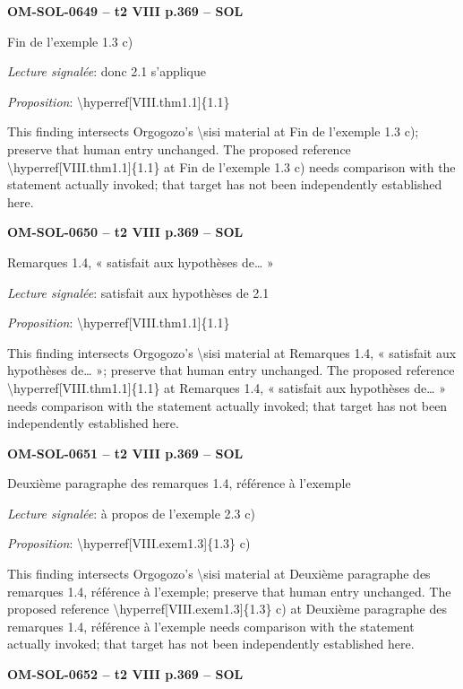 \par\noindent\textbf{OM-SOL-0649 -- t2 VIII p.369 -- SOL}\par
Fin de l'exemple 1.3 c)\par
\emph{Lecture signalée}: donc 2.1 s'applique\par
\emph{Proposition}: \textbackslash{}hyperref[VIII.thm1.1]\{1.1\}\par
This finding intersects Orgogozo's \textbackslash{}sisi material at Fin de l'exemple 1.3 c); preserve that human entry unchanged. The proposed reference \textbackslash{}hyperref[VIII.thm1.1]\{1.1\} at Fin de l'exemple 1.3 c) needs comparison with the statement actually invoked; that target has not been independently established here.\par
\par\noindent\textbf{OM-SOL-0650 -- t2 VIII p.369 -- SOL}\par
Remarques 1.4, « satisfait aux hypothèses de… »\par
\emph{Lecture signalée}: satisfait aux hypothèses de 2.1\par
\emph{Proposition}: \textbackslash{}hyperref[VIII.thm1.1]\{1.1\}\par
This finding intersects Orgogozo's \textbackslash{}sisi material at Remarques 1.4, « satisfait aux hypothèses de… »; preserve that human entry unchanged. The proposed reference \textbackslash{}hyperref[VIII.thm1.1]\{1.1\} at Remarques 1.4, « satisfait aux hypothèses de… » needs comparison with the statement actually invoked; that target has not been independently established here.\par
\par\noindent\textbf{OM-SOL-0651 -- t2 VIII p.369 -- SOL}\par
Deuxième paragraphe des remarques 1.4, référence à l'exemple\par
\emph{Lecture signalée}: à propos de l'exemple 2.3 c)\par
\emph{Proposition}: \textbackslash{}hyperref[VIII.exem1.3]\{1.3\} c)\par
This finding intersects Orgogozo's \textbackslash{}sisi material at Deuxième paragraphe des remarques 1.4, référence à l'exemple; preserve that human entry unchanged. The proposed reference \textbackslash{}hyperref[VIII.exem1.3]\{1.3\} c) at Deuxième paragraphe des remarques 1.4, référence à l'exemple needs comparison with the statement actually invoked; that target has not been independently established here.\par
\par\noindent\textbf{OM-SOL-0652 -- t2 VIII p.369 -- SOL}\par
